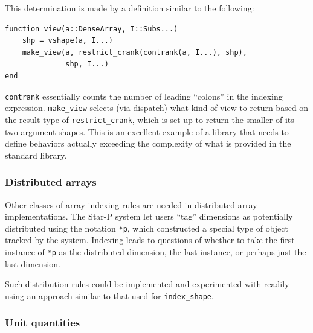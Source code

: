 \documentclass{sigplanconf}
\newcommand{\code}[1]{\texttt{#1}}
\begin{document}
This determination is made by a definition similar to the following:

\begin{minipage}{\linewidth}
{\small
\begin{verbatim}
function view(a::DenseArray, I::Subs...)
    shp = vshape(a, I...)
    make_view(a, restrict_crank(contrank(a, I...), shp),
              shp, I...)
end

\end{verbatim}
}
\end{minipage}

\code{contrank} essentially counts the number of leading ``colons'' in the
indexing expression. \code{make\_view} selects (via dispatch) what kind of
view to return based on the result type of \code{restrict\_crank}, which is
set up to return the smaller of its two argument shapes.
This is an excellent example of a library that needs to define behaviors
actually exceeding the complexity of what is provided in the standard library.

\subsubsection{Distributed arrays}

Other classes of array indexing rules are needed in distributed array
implementations. The Star-P system \cite{parry, Choy05parallelmatlab}
let users ``tag'' dimensions as potentially distributed using the notation
\code{*p}, which constructed a special type of object tracked by the system.
Indexing leads to questions of whether to take the first instance of \code{*p}
as the distributed dimension, the last instance, or perhaps just the last dimension.

Such distribution rules could be implemented and experimented with readily
using an approach similar to that used for \code{index\_shape}.



\subsubsection{Unit quantities}
\end{document}
